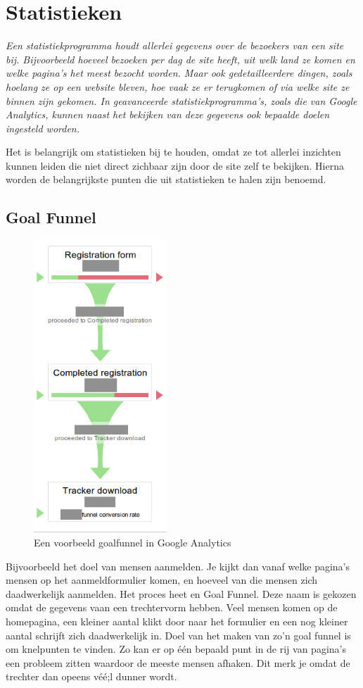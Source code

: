 \documentclass[a4paper, 10pt, pdftex]{report}
\begin{document}
    \section{Statistieken}
    \textit{Een statistiekprogramma houdt allerlei gegevens over de bezoekers van een site bij. Bijvoorbeeld hoeveel bezoeken per dag de site heeft, uit welk land ze komen en welke pagina's het meest bezocht worden. Maar ook gedetailleerdere dingen, zoals hoelang ze op een website bleven, hoe vaak ze er terugkomen of via welke site ze binnen zijn gekomen. In geavanceerde statistiekprogramma's, zoals die van Google Analytics, kunnen naast het bekijken van deze gegevens ook bepaalde doelen ingesteld worden.}

    Het is belangrijk om statistieken bij te houden, omdat ze tot allerlei inzichten kunnen leiden die niet direct zichbaar zijn door de site zelf te bekijken. Hierna worden de belangrijkste punten die uit statistieken te halen zijn benoemd.

    \subsection{Goal Funnel}
      \begin{figure}
      \caption{Een voorbeeld goalfunnel in Google Analytics}
        \includegraphics[width=50mm]{../images/goalfunnel}
    \end{figure}

    Bijvoorbeeld het doel van mensen aanmelden. Je kijkt dan vanaf welke pagina's mensen op het aanmeldformulier komen, en hoeveel van die mensen zich daadwerkelijk aanmelden. Het proces heet en Goal Funnel. Deze naam is gekozen omdat de gegevens vaan een trechtervorm hebben. Veel mensen komen op de homepagina, een kleiner aantal klikt door naar het formulier en een nog kleiner aantal schrijft zich daadwerkelijk in. Doel van het maken van zo'n goal funnel is om knelpunten te vinden. Zo kan er op \'e\'en bepaald punt in de rij van pagina's een probleem zitten waardoor de meeste mensen afhaken. Dit merk je omdat de trechter dan opeens v\'e\'e;l dunner wordt.
\end{document}
